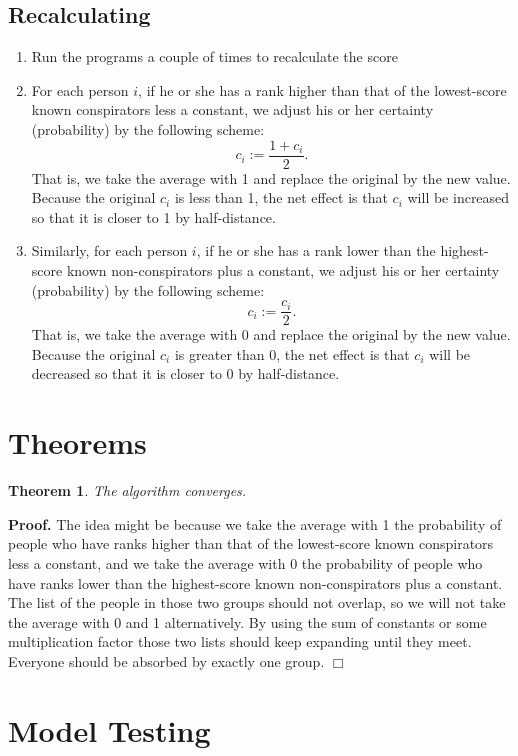 \documentclass{icmmcm}
\newtheorem{Theo1}{Theorem}
\begin{document}
\subsection{Recalculating}
\begin{enumerate}

\item Run the programs a couple of times to recalculate
the score 

\item For each person $i$,
if he or she has a 
rank higher than that of the lowest-score known conspirators less a constant,
we adjust his or her certainty (probability) by the following scheme:
\[c_i := \frac{1 + c_i}{2}.\]
That is, we take the average with 1 and replace the original by the new value. 
Because the original $c_i$ is less than 1, the net effect is that
$c_i$ will be increased so that it is closer to 1 by half-distance.

\item Similarly,
for each person $i$,
if he or she has a 
rank lower than the highest-score known non-conspirators plus a constant,
we adjust his or her certainty (probability) by the following scheme:
\[c_i := \frac{c_i}{2}.\]
That is, we take the average with 0 and replace the original by the new value. 
Because the original $c_i$ is greater than 0, the net effect is that
$c_i$ will be decreased so that it is closer to 0 by half-distance.

\end{enumerate}
\section{Theorems}
\begin{Theo1}
The algorithm converges.
\end{Theo1}
{\bf Proof.}
The idea might be because we take the average with 1 the 
probability of people who have
ranks higher than that of the lowest-score known conspirators less a constant, and we
take the average with 0 the 
probability of people who have ranks lower than the highest-score known non-conspirators plus a constant.
The list of the people in those two groups should not overlap,
so we will not take the average with 0 and 1 alternatively.
By using the sum of constants or some multiplication factor
those two lists should keep expanding until they meet.
Everyone should be absorbed by exactly one group. 
\hfill $\Box$

\section{Model Testing}
\end{document}
